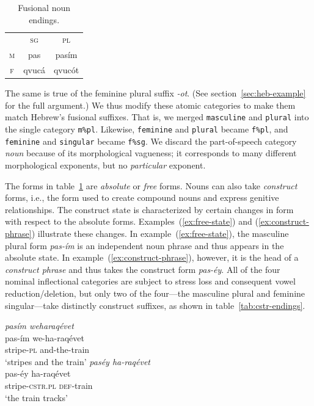 {\begin{description}
   \begin{table}[t]
      \small
      \centering
       \setlength{\extrarowheight}{6pt}
      \begin{tabular}{ccc} 
 \toprule
 &  \textsc{sg} & \textsc{pl}\\
\cmidrule{2-3} 
\textsc{m} & pas & pas\'{i}m \\
\textsc{f}  &	qvuc\'{a}	& qvuc\'{o}t \\	
    \bottomrule
    \end{tabular}
    \caption{Fusional noun endings.}
    \label{tab:abs-only}
    \end{table}
 The same is true 
of the feminine plural suffix \textit{-ot}. (See section~\ref{sec:heb-example} for the full argument.)
We thus modify these atomic categories to make them match 
Hebrew's fusional suffixes. That is, we merged \texttt{masculine} 
and \texttt{plural} into the single category \texttt{m\%pl}. Likewise, 
\texttt{feminine} and \texttt{plural} became \texttt{f\%pl}, and \texttt{feminine} 
and \texttt{singular} became \texttt{f\%sg}.
We discard the part-of-speech category \emph{noun} because of its morphological vagueness; it corresponds to many different morphological exponents, but no \emph{particular} exponent.

\item[Construct State.]
The forms in table~\ref{tab:abs-only} are \emph{absolute} or \emph{free} forms. 
Nouns can also take \emph{construct} forms, i.e., the form used to create compound 
nouns and express genitive relationships. The construct state is characterized by 
certain changes in form with respect to the absolute forms. 
Examples~(\ref{ex:free-state}) and (\ref{ex:construct-phrase})
illustrate these changes.
In example~(\ref{ex:free-state}), the masculine plural form \textit{pas-\'{i}m} is an independent noun phrase 
and thus appears in the absolute state. In example~(\ref{ex:construct-phrase}), however, it is the head 
of a \emph{construct phrase} and thus takes the construct form \emph{pas-\'{e}y}. 
All of the four nominal inflectional categories are subject to stress loss and consequent 
vowel reduction/deletion, but only two of the four---the masculine plural and 
feminine singular---take distinctly construct suffixes, as shown in table~\ref{tab:cstr-endings}. 

\begin{exe}
\ex \textit{pas\'{i}m \quad weharaq\'{e}vet} \\ \label{ex:free-state} 
pas-\'{i}m \quad we-ha-raq\'{e}vet \\
stripe-\textsc{pl} \quad and-the-train \\
`stripes and the train'
\ex  \textit{pas\'{e}y \quad ha-raq\'{e}vet} \\ \label{ex:construct-phrase}
pas-\'{e}y \quad ha-raq\'{e}vet \\
stripe-\textsc{cstr.pl} \quad \textsc{def}-train \\
`the train tracks'
\end{exe}


\end{description}}
